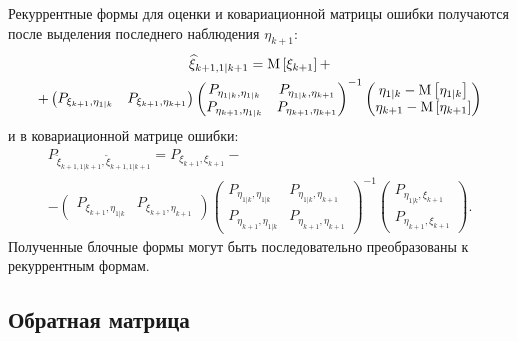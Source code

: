 Рекуррентные формы для оценки и ковариационной матрицы ошибки получаются после выделения последнего наблюдения $\eta_{k+1}$:
\begin{multline} \label{equation:filtering:in_states:process:block:state_estimate}
	\widehat{\xi}_{k+1, 1|k+1}
		= \mathrm{M} \left [ \xi_{k+1} \right ] + \\
	+ \begin{pmatrix} P_{\xi_{k+1}, \eta_{1|k}} & P_{\xi_{k+1}, \eta_{k+1}} \end{pmatrix}
		\begin{pmatrix}
			P_{\eta_{1|k}, \eta_{1|k}} & P_{\eta_{1|k}, \eta_{k+1}} \\
			P_{\eta_{k+1}, \eta_{1|k}} & P_{\eta_{k+1}, \eta_{k+1}}
		\end{pmatrix}^{-1}
		\begin{pmatrix}
			\eta_{1|k} - \mathrm{M} \left [ \eta_{1|k} \right ] \\
			\eta_{k+1} - \mathrm{M} \left [ \eta_{k+1} \right ]
		\end{pmatrix}
\end{multline}
и в ковариационной матрице ошибки:
\begin{multline} \label{equation:filtering:in_states:process:block:error_covariance}
	P_{\widetilde{\xi}_{k+1,1|k+1}, \widetilde{\xi}_{k+1,1|k+1}}
		= P_{\xi_{k+1}, \xi_{k+1}} - \\
	- \begin{pmatrix} P_{\xi_{k+1}, \eta_{1|k}} & P_{\xi_{k+1}, \eta_{k+1}} \end{pmatrix}
		\begin{pmatrix}
			P_{\eta_{1|k}, \eta_{1|k}} & P_{\eta_{1|k}, \eta_{k+1}} \\
			P_{\eta_{k+1}, \eta_{1|k}} & P_{\eta_{k+1}, \eta_{k+1}}
		\end{pmatrix}^{-1}
		\begin{pmatrix}
			P_{\eta_{1|k}, \xi_{k+1}} \\
			P_{\eta_{k+1}, \xi_{k+1}}
		\end{pmatrix}
	.
\end{multline}
Полученные блочные формы могут быть последовательно преобразованы к рекуррентным формам.

\subsection{Обратная матрица}

